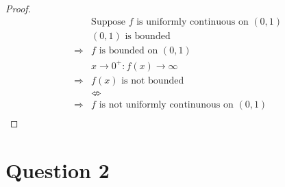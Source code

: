 \documentclass{article}
\begin{document}
~

\begin{proof}
    \begin{align*}
        &\text{Suppose }f\text{ is uniformly continuous on }(0,1)\\
        &(0,1)\text{ is bounded}\\
        \Rightarrow&f\text{ is bounded on }(0,1)\\
        &x\to0^+:f(x)\to\infty\\
        \Rightarrow&f(x)\text{ is not bounded}\\
        &\nLeftrightarrow\\
        \Rightarrow&f\text{ is not uniformly continunous on }(0,1)\\
    \end{align*}
\end{proof}

\newpage

\section*{Question 2}

~
\end{document}
